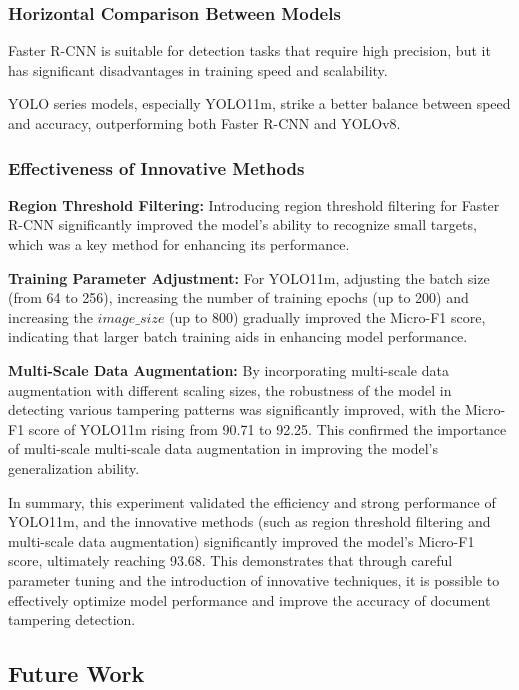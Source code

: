 \subsubsection{Horizontal Comparison Between Models}

Faster R-CNN is suitable for detection tasks that require high precision, but it has significant disadvantages in training speed and scalability.

YOLO series models, especially YOLO11m, strike a better balance between speed and accuracy, outperforming both Faster R-CNN and YOLOv8.

\subsubsection{Effectiveness of Innovative Methods}

\textbf{Region Threshold Filtering:} Introducing region threshold filtering for Faster R-CNN significantly improved the model's ability to recognize small targets, which was a key method for enhancing its performance.

\textbf{Training Parameter Adjustment:} For YOLO11m, adjusting the batch size (from 64 to 256), increasing the number of training epochs (up to 200) and increasing the $image\_size$ (up to 800) gradually improved the Micro-F1 score, indicating that larger batch training aids in enhancing model performance.

\textbf{Multi-Scale Data Augmentation:} By incorporating multi-scale data augmentation with different scaling sizes, the robustness of the model in detecting various tampering patterns was significantly improved, with the Micro-F1 score of YOLO11m rising from 90.71 to 92.25. This confirmed the importance of multi-scale multi-scale data augmentation in improving the model's generalization ability.

In summary, this experiment validated the efficiency and strong performance of YOLO11m, and the innovative methods (such as region threshold filtering and multi-scale data augmentation) significantly improved the model's Micro-F1 score, ultimately reaching 93.68. This demonstrates that through careful parameter tuning and the introduction of innovative techniques, it is possible to effectively optimize model performance and improve the accuracy of document tampering detection.

\subsection{Future Work}

